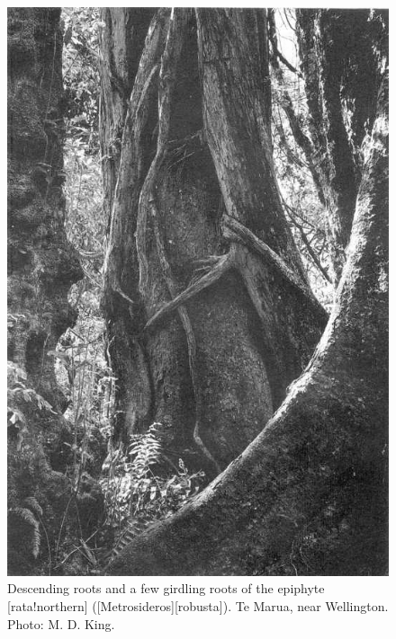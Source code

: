 \begin{figure}[!htb]
	\centering
	\begin{minipage}[t]{0.53\textwidth}
		\centering
		\includegraphics[width=\textwidth]{graphics/figure50rata.jpg}
    	\caption[Descending roots and a few girdling roots of the epiphyte northern rata]{Descending roots and a few girdling roots of the epiphyte [rata!northern] ([Metrosideros][robusta]).
        Te Marua, near Wellington.
    	Photo: M. D. King.}%
    	\label{fig:50rata}
	\end{minipage}\hfill%
	\begin{minipage}[t]{0.45\textwidth}
    	\centering

\end{minipage}
\end{figure}
